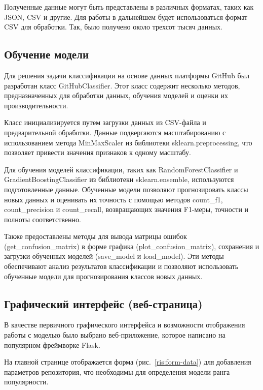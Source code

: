 Полученные данные могут быть представлены в различных форматах, таких как JSON, CSV и другие. Для работы в дальнейшем будет использоваться формат CSV для обработки. Так, было получено около трехсот тысяч данных.

\subsection{Обучение модели}
\label{subsec:Learning}

Для решения задачи классификации на основе данных платформы GitHub был разработан класс GitHubClassifier. Этот класс содержит несколько методов, предназначенных для обработки данных, обучения моделей и оценки их производительности.

Класс инициализируется путем загрузки данных из CSV-файла и предварительной обработки. Данные подвергаются масштабированию с использованием метода MinMaxScaler из библиотеки sklearn.preprocessing, что позволяет привести значения признаков к одному масштабу.

Для обучения моделей классификации, таких как RandomForestClassifier и GradientBoostingClassifier из библиотеки sklearn.ensemble, используются подготовленные данные. Обученные модели позволяют прогнозировать классы новых данных и оценивать их точность с помощью методов count\_f1, count\_precision и count\_recall, возвращающих значения F1-меры, точности и полноты соответственно.

Также предоставлены методы для вывода матрицы ошибок (get\_confusion\_matrix) в форме графика (plot\_confusion\_matrix), сохранения и загрузки обученных моделей (save\_model и load\_model). Эти методы обеспечивают анализ результатов классификации и позволяют использовать обученные модели для прогнозирования классов новых данных.

\subsection{Графический интерфейс (веб-страница)}
\label{subsec:gui}

В качестве первичного графического интерфейса и возможности отображения работы с моделью было выбрано веб-приложение, которое написано на популярном фреймворке Flask. 

На главной странице отображается форма (рис.~\ref{ris:form-data}) для добавления параметров репозитория, что необходимы для определения модели ранга популярности. 

